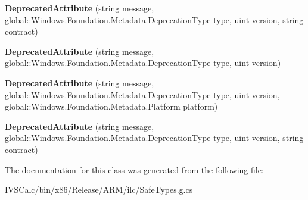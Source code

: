 \begin{DoxyCompactItemize}
{\bfseries Deprecated\+Attribute} (string message, global\+::\+Windows.\+Foundation.\+Metadata.\+Deprecation\+Type type, uint version, string contract)
\item 
\mbox{\label{class_windows_1_1_foundation_1_1_metadata_1_1_deprecated_attribute_a6ab4cdc714aeb94c30e9c44038807120}} 
{\bfseries Deprecated\+Attribute} (string message, global\+::\+Windows.\+Foundation.\+Metadata.\+Deprecation\+Type type, uint version)
\item 
\mbox{\label{class_windows_1_1_foundation_1_1_metadata_1_1_deprecated_attribute_a17e8fceeae3254fa89cd64e410f2ca4e}} 
{\bfseries Deprecated\+Attribute} (string message, global\+::\+Windows.\+Foundation.\+Metadata.\+Deprecation\+Type type, uint version, global\+::\+Windows.\+Foundation.\+Metadata.\+Platform platform)
\item 
\mbox{\label{class_windows_1_1_foundation_1_1_metadata_1_1_deprecated_attribute_aa776754af460f6e292c26901285ed49a}} 
{\bfseries Deprecated\+Attribute} (string message, global\+::\+Windows.\+Foundation.\+Metadata.\+Deprecation\+Type type, uint version, string contract)
\end{DoxyCompactItemize}


The documentation for this class was generated from the following file\+:\begin{DoxyCompactItemize}
\item 
I\+V\+S\+Calc/bin/x86/\+Release/\+A\+R\+M/ilc/Safe\+Types.\+g.\+cs\end{DoxyCompactItemize}
